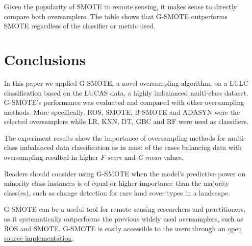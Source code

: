\documentclass[remotesensing,article,submit,moreauthors,pdftex]{Definitions/mdpi}
\begin{document}
Given the popularity of SMOTE in remote sensing, it makes sense to directly
compare both oversamplers. The table shows that G-SMOTE outperforms SMOTE
regardless of the classifier or metric used.

\section{Conclusions}

In this paper we applied G-SMOTE, a novel oversampling algorithm, on a LULC
classification based on the LUCAS data, a highly imbalanced multi-class dataset.
G-SMOTE's performance was evaluated and compared with other oversampling
methods. More specifically, ROS, SMOTE, B-SMOTE and ADASYN were the selected
oversamplers while LR, KNN, DT, GBC and RF were used as classifiers.

The experiment results show the importance of oversampling methods for
multi-class imbalanced data classification as in most of the cases balancing
data with oversampling resulted in higher \textit{F-score} and \textit{G-mean}
values.

Readers should consider using G-SMOTE when the model’s predictive power on
minority class instances is of equal or higher importance than the majority
class(es), such as change detection for rare land cover types in a landscape.

G-SMOTE can be a useful tool for remote sensing researchers and practitioners,
as it systematically outperforms the previous widely used oversamplers, such as
ROS and SMOTE. G-SMOTE is easily accessible to the users through an
\href{https://geometric-smote.readthedocs.io/en/latest/?badge=latest}{open
	source implementation}.

\vspace{6pt}




\end{document}
